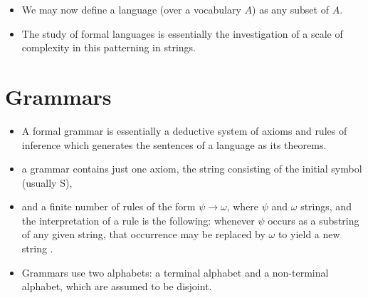 \documentclass{beamer}
\begin{document}
	\begin{frame}
		\begin{itemize}
			\item We may now define a language (over a vocabulary $A$) as any subset of $A$.
		\end{itemize}
	\end{frame}


	\begin{frame}
		\begin{itemize}
			\item The study of formal languages is essentially the investigation of a scale of complexity in this patterning in strings.
		\end{itemize}
	\end{frame}


	\section{Grammars}

	\begin{frame}
		\begin{itemize}
			\item A formal grammar is essentially a deductive system of axioms and rules of inference which generates the sentences of a language as its theorems.
		\end{itemize}
	\end{frame}


	\begin{frame}
		\begin{itemize}
			\item a grammar contains just one axiom, the string consisting of the initial symbol (usually S),
			\item and a finite number of rules of the form $\psi \rightarrow \omega$, where $\psi$ and $\omega$ strings, and the interpretation of a rule is the following: whenever $\psi$ occurs as a substring of any given string, that occurrence may be replaced by $\omega$ to yield a new string .
		\end{itemize}
	\end{frame}


	\begin{frame}
		\begin{itemize}
			\item Grammars use two alphabets: a terminal alphabet and a non-terminal alphabet, which are assumed to be disjoint.
		\end{itemize}
	\end{frame}
\end{document}
